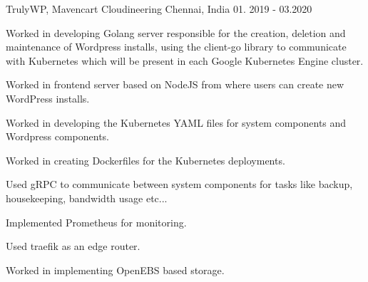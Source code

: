 


\begin{cventries}


\cventry
{TrulyWP, Mavencart} %
{Cloudineering} %
{Chennai, India} %
{01. 2019 - 03.2020} %
{ %
\begin{cvitems}
\item {Worked in developing Golang server responsible for the creation, deletion and maintenance of Wordpress installs, using the client-go library to communicate with Kubernetes which will be present in each Google Kubernetes Engine cluster.}
\item {Worked in frontend server based on NodeJS from where users can create new WordPress installs.}
\item{Worked in developing the Kubernetes YAML files for system components and Wordpress components.}
\item{Worked in creating Dockerfiles for the Kubernetes deployments.}
\item{Used gRPC to communicate between system components for tasks like backup, housekeeping, bandwidth usage etc...}
\item {Implemented Prometheus for monitoring.}
\item{Used traefik as an edge router.}
\item{Worked in implementing OpenEBS based storage.}
\end{cvitems}
}



\end{cventries}
